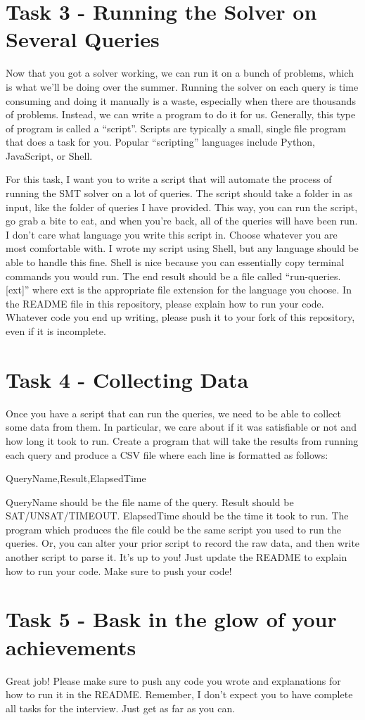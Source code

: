 \documentclass{article}
\begin{document}
\section*{Task 3 - Running the Solver on Several Queries}
Now that you got a solver working, we can run it on a bunch of problems, which is what we'll be doing over the summer.
Running the solver on each query is time consuming and doing it manually is a waste, especially when there are thousands of problems.
Instead, we can write a program to do it for us.
Generally, this type of program is called a ``script''.
Scripts are typically a small, single file program that does a task for you.
Popular ``scripting'' languages include Python, JavaScript, or Shell.

For this task, I want you to write a script that will automate the process of running the SMT solver on a lot of queries.
The script should take a folder in as input, like the folder of queries I have provided.
This way, you can run the script, go grab a bite to eat, and when you're back, all of the queries will have been run.
I don't care what language you write this script in.
Choose whatever you are most comfortable with.
I wrote my script using Shell, but any language should be able to handle this fine.
Shell is nice because you can essentially copy terminal commands you would run.
The end result should be a file called ``run-queries.[ext]'' where ext is the appropriate file extension for the language you choose.
In the README file in this repository, please explain how to run your code.
Whatever code you end up writing, please push it to your fork of this repository, even if it is incomplete.

\section*{Task 4 - Collecting Data}
Once you have a script that can run the queries, we need to be able to collect some data from them. In particular, we care about if it was satisfiable or not and how long it took to run.
Create a program that will take the results from running each query and produce a CSV file where each line is formatted as follows:

\vspace{2mm}
\noindent
QueryName,Result,ElapsedTime
\vspace{2mm}

\noindent
QueryName should be the file name of the query.
Result should be SAT/UNSAT/TIMEOUT.
ElapsedTime should be the time it took to run.
The program which produces the file could be the same script you used to run the queries. 
Or, you can alter your prior script to record the raw data, and then write another script to parse it. It's up to you!
Just update the README to explain how to run your code.
Make sure to push your code!

\section*{Task 5 - Bask in the glow of your achievements}
Great job! Please make sure to push any code you wrote and explanations for how to run it in the README. Remember, I don't expect you to have complete all tasks for the interview. Just get as far as you can.
\end{document}
